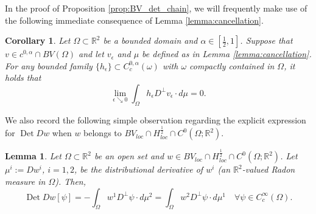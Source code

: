 \documentclass[12pt]{article}
\newcommand{\R}{\mathbb{R}}
\newcommand{\Det}{\operatorname{Det}}
\theoremstyle{plain}
\newtheorem{lemma}[theorem]{Lemma}
\newtheorem{corollary}[theorem]{Corollary}
\numberwithin{equation}{section}
\begin{document}
In the proof of Proposition \ref{prop:BV_det_chain}, we will frequently make use of the following immediate consequence of Lemma \ref{lemma:cancellation}.

\begin{corollary}\label{Cor:WedCan}
Let $\Omega \subset \R^2$ be a bounded domain and $\alpha \in [\frac{1}{2},1]$. Suppose that $v \in c^{0,\alpha} \cap BV(\Omega)$ and let $v_\epsilon$ and $\mu$ be defined as in Lemma \ref{lemma:cancellation}. For any bounded family $\{h_\epsilon\} \subset  C^{0,\alpha}_c(\omega)$ with $\omega$ compactly contained in $\Omega$, it holds that
\begin{equation*} 
    \lim_{\epsilon \searrow 0} \int_\Omega h_\epsilon D^\perp v_\epsilon \cdot d\mu  = 0.
\end{equation*}
\end{corollary}

We also record the following simple observation regarding the explicit expression for $\Det Dw$ when $w$ belongs to $BV_{loc} \cap H^\frac12_{loc} \cap C^0(\Omega;\R^2)$.
\begin{lemma} \label{lemma:DetFormulaBV}
    Let $\Omega \subset \R^2$ be an open set and $w \in BV_{loc} \cap H^\frac12_{loc} \cap C^0(\Omega;\R^2)$. Let $\mu^i := Dw^i$, $i=1,2$, be the distributional derivative of $w^i$ (an $\R^2$-valued Radon measure in $\Omega$). Then, 
    \begin{equation*}
        \Det Dw [\psi] = -\int_\Omega w^1 D^\perp \psi \cdot d\mu^2 = \int_\Omega w^2 D^\perp \psi \cdot d\mu^1 \quad \forall \psi \in C^\infty_c(\Omega).
    \end{equation*}
\end{lemma}
\end{document}
